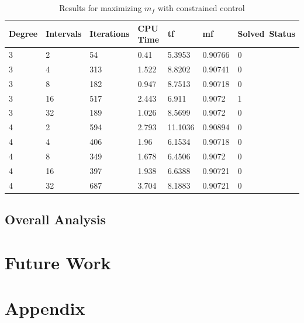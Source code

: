 \documentclass[]{article}
\begin{document}
	\begin{table}
		\begin{tabular}{lllllll}
			Degree & Intervals & Iterations & CPU Time & tf & mf & Solved\ Status \\ 
			\hline 
			3 & 2 & 54 & 0.41 & 5.3953 & 0.90766 & 0 \\ 
			3 & 4 & 313 & 1.522 & 8.8202 & 0.90741 & 0 \\ 
			3 & 8 & 182 & 0.947 & 8.7513 & 0.90718 & 0 \\ 
			3 & 16 & 517 & 2.443 & 6.911 & 0.9072 & 1 \\ 
			3 & 32 & 189 & 1.026 & 8.5699 & 0.9072 & 0 \\ 
			4 & 2 & 594 & 2.793 & 11.1036 & 0.90894 & 0 \\ 
			4 & 4 & 406 & 1.96 & 6.1534 & 0.90718 & 0 \\ 
			4 & 8 & 349 & 1.678 & 6.4506 & 0.9072 & 0 \\ 
			4 & 16 & 397 & 1.938 & 6.6388 & 0.90721 & 0 \\ 
			4 & 32 & 687 & 3.704 & 8.1883 & 0.90721 & 0 \\ 
			\hline 
		\end{tabular}
		\caption{Results for maximizing \(m_f\) with constrained control}
		\label{table:4}
	\end{table}
	\FloatBarrier

	\subsection{Overall Analysis}
	
	\section{Future Work}

	
	\section{Appendix}
	
	
	
	
	
	
    
\end{document}

